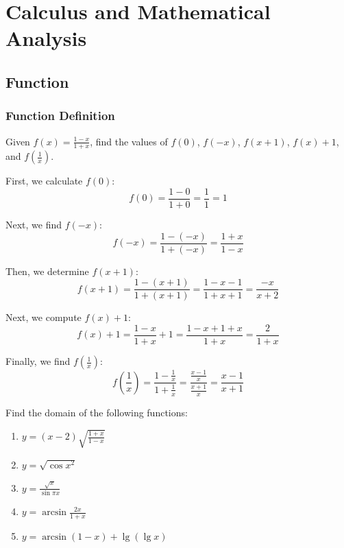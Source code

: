\chapter{Calculus and Mathematical Analysis}

\section{Function}

\subsection{Function Definition}

\begin{exercise}
Given \( f(x) = \frac{1-x}{1+x} \), find the values of \( f(0) \), \( f(-x) \), \( f(x+1) \), \( f(x) + 1 \), and \( f\left( \frac{1}{x} \right) \).
\end{exercise}
\begin{solution}
First, we calculate \( f(0) \):
\[
f(0) = \frac{1-0}{1+0} = \frac{1}{1} = 1
\]

Next, we find \( f(-x) \):
\[
f(-x) = \frac{1-(-x)}{1+(-x)} = \frac{1+x}{1-x}
\]

Then, we determine \( f(x+1) \):
\[
f(x+1) = \frac{1-(x+1)}{1+(x+1)} = \frac{1-x-1}{1+x+1} = \frac{-x}{x+2}
\]

Next, we compute \( f(x) + 1 \):
\[
f(x) + 1 = \frac{1-x}{1+x} + 1 = \frac{1-x + 1+x}{1+x} = \frac{2}{1+x}
\]

Finally, we find \( f\left( \frac{1}{x} \right) \):
\[
f\left( \frac{1}{x} \right) = \frac{1 - \frac{1}{x}}{1 + \frac{1}{x}} = \frac{\frac{x-1}{x}}{\frac{x+1}{x}} = \frac{x-1}{x+1}
\]
\end{solution}

\begin{exercise}
Find the domain of the following functions:
\begin{enumerate}
    \item \( y = (x-2) \sqrt{\frac{1+x}{1-x}} \)
    \item \( y = \sqrt{\cos x^2} \)
    \item \( y = \frac{\sqrt{x}}{\sin \pi x} \)
    \item \( y = \arcsin \frac{2x}{1+x} \)
    \item \( y = \arcsin (1-x) + \lg (\lg x) \)
\end{enumerate}
\end{exercise}

